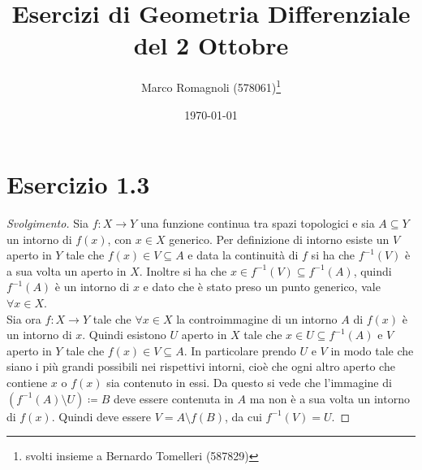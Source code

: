 \documentclass[italian,a4paper,11pt]{article}
\title{Esercizi di Geometria Differenziale\\ del 2 Ottobre}
\author{Marco Romagnoli (578061)\thanks{svolti insieme a Bernardo Tomelleri (587829)}}
\date{\today}
\begin{document}
\maketitle

\section*{Esercizio 1.3}
\begin{proof}[Svolgimento]
Sia $f:X\rightarrow Y$ una funzione continua tra spazi topologici e sia $A\subseteq Y$ un intorno di $f(x)$, con $x\in X$ generico.
Per definizione di intorno esiste un $V$ aperto in $Y$ tale che $f(x) \in V \subseteq A$ e data la continuità di $f$ si ha che $f^{-1}(V)$ è a sua volta un aperto in $X$.
Inoltre si ha che $x\in f^{-1}(V) \subseteq f^{-1}(A)$, quindi $f^{-1}(A)$ è un intorno di $x$ e dato che è stato preso un punto generico, vale $\forall x \in X$.\\
Sia ora $f:X\rightarrow Y$ tale che $\forall x \in X$ la controimmagine di un intorno $A$ di $f(x)$ è un intorno di $x$. 
Quindi esistono $U$ aperto in $X$ tale che $x \in U \subseteq f^{-1}(A)$ e $V$ aperto in $Y$ tale che $f(x) \in V \subseteq A$. In particolare prendo $U$ e $V$ in modo tale che siano i più grandi possibili nei rispettivi intorni, cioè che ogni altro aperto che contiene $x$ o $f(x)$ sia contenuto in essi. Da questo si vede che l'immagine di $\left( f^{-1}(A) \setminus U\right) \coloneqq B$ deve essere contenuta in $A$ ma non è a sua volta un intorno di $f(x)$. 
Quindi deve essere $V=A\setminus f(B)$, da cui $f^{-1}(V) = U$.
 
\end{proof}
\end{document}

